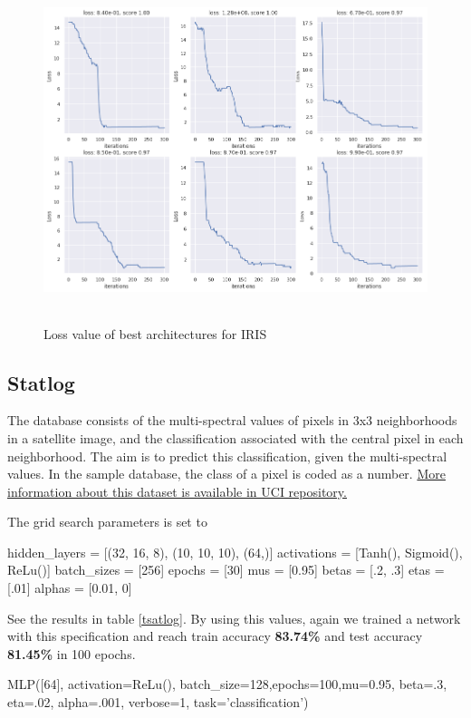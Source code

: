 \documentclass[10pt]{SelfArx} %
\begin{document}
\begin{figure}\centering
	\includegraphics[width=1.79\columnwidth, height=10cm]{img/iris-plots1}
	\caption{Loss value of best architectures for IRIS}
	\label{firis}
\end{figure}

\subsection{Statlog}
The database consists of the multi-spectral values of pixels in 3x3 neighborhoods in a satellite image, and the classification associated with the central pixel in each neighborhood. The aim is to predict this classification, given the multi-spectral values. In the sample database, the class of a pixel is coded as a number. \href{https://archive.ics.uci.edu/ml/datasets/Statlog+(Landsat+Satellite)}{More information about this dataset is available in UCI repository.}

The grid search parameters is set to

\begin{python}
hidden_layers = [(32, 16, 8),
             (10, 10, 10), (64,)]
activations = [Tanh(), Sigmoid(),
               ReLu()]
batch_sizes = [256]
epochs = [30]
mus = [0.95]
betas = [.2, .3]
etas = [.01]
alphas = [0.01, 0]
\end{python}
See the results in table \ref{tsatlog}. By using this values, again we trained a network with this specification and reach train accuracy \textbf{83.74\%} and test accuracy \textbf{81.45\%} in 100 epochs.

\begin{python}
MLP([64], activation=ReLu(), 
batch_size=128,epochs=100,mu=0.95,
beta=.3, eta=.02, alpha=.001,
verbose=1, task='classification')
\end{python}
\end{document}
